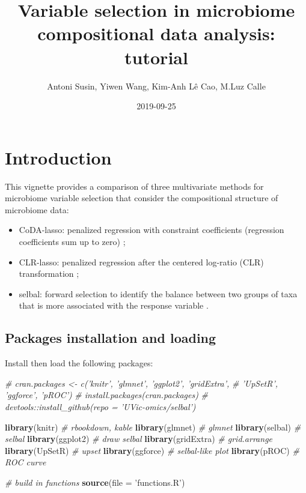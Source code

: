 \documentclass[openany]{book}
\title{Variable selection in microbiome compositional data analysis: tutorial}
\author{Antoni Susin, Yiwen Wang, Kim-Anh Lê Cao, M.Luz Calle}
\date{2019-09-25}
\newenvironment{Shaded}{\begin{snugshade}}{\end{snugshade}}
\newcommand{\KeywordTok}[1]{\textcolor[rgb]{0.13,0.29,0.53}{\textbf{#1}}}
\newcommand{\DataTypeTok}[1]{\textcolor[rgb]{0.13,0.29,0.53}{#1}}
\newcommand{\StringTok}[1]{\textcolor[rgb]{0.31,0.60,0.02}{#1}}
\newcommand{\CommentTok}[1]{\textcolor[rgb]{0.56,0.35,0.01}{\textit{#1}}}
\newcommand{\NormalTok}[1]{#1}
\providecommand{\tightlist}{%
  \setlength{\itemsep}{0pt}\setlength{\parskip}{0pt}}
\begin{document}
\maketitle

{
\setcounter{tocdepth}{3}
\tableofcontents
}
\chapter{Introduction}\label{introduction}

This vignette provides a comparison of three multivariate methods for
microbiome variable selection that consider the compositional structure
of microbiome data:

\begin{itemize}
\tightlist
\item
  CoDA-lasso: penalized regression with constraint coefficients
  (regression coefficients sum up to zero)
  \citep{lu2019generalized, lin2014variable};
\item
  CLR-lasso: penalized regression after the centered log-ratio (CLR)
  transformation
  \citep{zou2005regularization, tibshirani1996regression, le1992ridge};
\item
  selbal: forward selection to identify the balance between two groups
  of taxa that is more associated with the response variable
  \citep{rivera2018balances}.
\end{itemize}

\section{Packages installation and
loading}\label{packages-installation-and-loading}

Install then load the following packages:

\begin{Shaded}
\begin{Highlighting}[]
\CommentTok{# cran.packages <- c('knitr', 'glmnet', 'ggplot2', 'gridExtra',}
\CommentTok{#                    'UpSetR', 'ggforce', 'pROC')}
\CommentTok{# install.packages(cran.packages)}
\CommentTok{# devtools::install_github(repo = 'UVic-omics/selbal')}

\KeywordTok{library}\NormalTok{(knitr) }\CommentTok{# rbookdown, kable}
\KeywordTok{library}\NormalTok{(glmnet) }\CommentTok{# glmnet}
\KeywordTok{library}\NormalTok{(selbal) }\CommentTok{# selbal}
\KeywordTok{library}\NormalTok{(ggplot2) }\CommentTok{# draw selbal}
\KeywordTok{library}\NormalTok{(gridExtra) }\CommentTok{# grid.arrange}
\KeywordTok{library}\NormalTok{(UpSetR) }\CommentTok{# upset}
\KeywordTok{library}\NormalTok{(ggforce) }\CommentTok{# selbal-like plot}
\KeywordTok{library}\NormalTok{(pROC) }\CommentTok{# ROC curve}

\CommentTok{# build in functions}
\KeywordTok{source}\NormalTok{(}\DataTypeTok{file =} \StringTok{'functions.R'}\NormalTok{)}
\end{Highlighting}
\end{Shaded}
\end{document}

